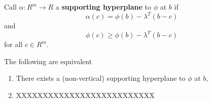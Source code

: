 \begin{defn}
  \label{defn:4}
  Call $\alpha: R^{m} \rightarrow R$ a \textbf{supporting hyperplane}
  to $\phi$ at $b$ if
  \begin{equation}
    \label{eq:9}
    \alpha(c) = \phi(b) - \lambda^{T}(b - c)
  \end{equation} and 
  \begin{equation}
    \label{eq:10}
    \phi(c) \geq \phi(b) - \lambda^{T}(b - c)
  \end{equation} for all $c \in R^{m}$.
\end{defn}

\begin{thm}
  The following are equivalent
  \begin{enumerate}
  \item There exists a (non-vertical) supporting hyperplane to $\phi$
    at $b$,
  \item XXXXXXXXXXXXXXXXXXXXXXXXXX
  \end{enumerate}
\end{thm}

